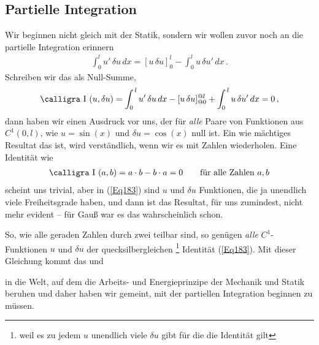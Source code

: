 {%
{\textcolor{sectionTitleBlue}{\subsection{Partielle Integration }}
Wir beginnen nicht gleich mit der Statik, sondern wir wollen zuvor noch an die partielle Integration erinnern
\begin{align}
\int_{0}^{l} u'\,\delta u\,dx = [u\,\delta u]_0^l - \int_{0}^{l} u\,\delta u'\,dx\,.
\end{align}
Schreiben wir das als \glq Null-Summe\grq{},
\begin{align}\label{Eq183}
\text{\normalfont\calligra I\,\,}(u, \delta u) = \int_0^{\,l} u'\,\delta u\,dx - [u\,\delta u]_{@0}^{@l} + \int_0^{\,l} u\,\delta u'\,dx = 0\,,
\end{align}
dann haben wir einen Ausdruck vor uns, der f\"{u}r {\em alle\/} Paare von Funktionen aus $C^1(0,l)$, wie $u = \sin(x)$ und $\delta u = \cos(x)$ null ist. Ein wie m\"{a}chtiges Resultat das ist, wird  verst\"{a}ndlich, wenn wir es mit Zahlen wiederholen. Eine Identit\"{a}t wie
\begin{align}
\text{\normalfont\calligra I\,\,}(a, b) = a \cdot b - b \cdot a = 0 \qquad \text{f\"{u}r alle Zahlen $a, b$}
\end{align}
scheint uns trivial, aber in (\ref{Eq183}) sind $u $ und $\delta u $  Funktionen, die ja unendlich viele Freiheitsgrade haben, und dann ist das Resultat, f\"{u}r uns zumindest, nicht mehr evident -- f\"{u}r Gau{\ss} war es das wahrscheinlich schon.

So, wie alle geraden Zahlen durch zwei teilbar sind, so gen\"{u}gen {\em alle\/} $C^1$-Funktionen $u $ und $\delta u $ der \glq quecksilbergleichen\grq{} \footnote{weil es zu jedem $u$ unendlich viele $\delta u$ gibt f\"{u}r die die Identit\"{a}t gilt}  Identit\"{a}t (\ref{Eq183}).
Mit dieser Gleichung kommt das \grq{} und \/}\grq{} in die Welt, auf dem die Arbeits- und Energieprinzipe der Mechanik und Statik beruhen und daher haben wir gemeint, mit der partiellen Integration beginnen zu m\"{u}ssen.

}
